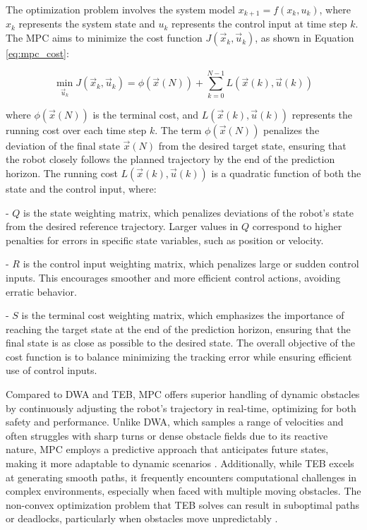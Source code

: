 \documentclass[conference]{IEEEtran}
\begin{document}
The optimization problem involves the system model \(x_{k+1} = f(x_k, u_k)\), where \(x_k\) represents the system state and \(u_k\) represents the control input at time step \(k\). The MPC aims to minimize the cost function \(J(\vec{x}_k, \vec{u}_k)\), as shown in Equation \eqref{eq:mpc_cost}:

\begin{equation}
\label{eq:mpc_cost}
\min_{\vec{u}_k} J(\vec{x}_k, \vec{u}_k) = \phi(\vec{x}(N)) + \sum_{k=0}^{N-1} L(\vec{x}(k), \vec{u}(k))
\end{equation}

where \( \phi(\vec{x}(N)) \) is the terminal cost, and \(L(\vec{x}(k), \vec{u}(k))\) represents the running cost over each time step \(k\). The term \( \phi(\vec{x}(N)) \) penalizes the deviation of the final state \(\vec{x}(N)\) from the desired target state, ensuring that the robot closely follows the planned trajectory by the end of the prediction horizon. The running cost \(L(\vec{x}(k), \vec{u}(k))\) is a quadratic function of both the state and the control input, where:

- \( Q \) is the state weighting matrix, which penalizes deviations of the robot’s state from the desired reference trajectory. Larger values in \( Q \) correspond to higher penalties for errors in specific state variables, such as position or velocity.

- \( R \) is the control input weighting matrix, which penalizes large or sudden control inputs. This encourages smoother and more efficient control actions, avoiding erratic behavior.

- \( S \) is the terminal cost weighting matrix, which emphasizes the importance of reaching the target state at the end of the prediction horizon, ensuring that the final state is as close as possible to the desired state. The overall objective of the cost function is to balance minimizing the tracking error while ensuring efficient use of control inputs.

Compared to DWA and TEB, MPC offers superior handling of dynamic obstacles by continuously adjusting the robot’s trajectory in real-time, optimizing for both safety and performance. Unlike DWA, which samples a range of velocities and often struggles with sharp turns or dense obstacle fields due to its reactive nature, MPC employs a predictive approach that anticipates future states, making it more adaptable to dynamic scenarios \cite{ASAP}. Additionally, while TEB excels at generating smooth paths, it frequently encounters computational challenges in complex environments, especially when faced with multiple moving obstacles. The non-convex optimization problem that TEB solves can result in suboptimal paths or deadlocks, particularly when obstacles move unpredictably \cite{ASAP, MPCvsTEB}.
\end{document}

